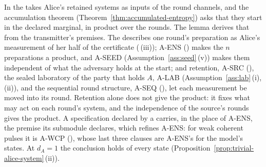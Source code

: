
In  the  takes Alice's retained
systems as inputs of the round channels, and the accumulation theorem
(Theorem~\ref{thm:accumulated-entropy}) asks that they start in the declared
marginal, in product over the rounds. The lemma derives that from the
transmitter's premises. The  describes
one round's preparation as Alice's measurement of her half of the certificate
(\,(iii)); A-ENS
() makes the $n$ preparations a product, and
A-SEED (Assumption~\ref{ass:seed}\,(v)) makes them independent of what the
adversary holds at the start; and retention, A-SRC
(), the sealed laboratory of the party that holds
$A$, A-LAB (Assumption~\ref{ass:lab}\,(i), (ii)), and the sequential round structure,
A-SEQ (), let each measurement be moved into its
round. Retention alone does not give the product: it fixes what may
act on each round's system, and the independence of the source's rounds gives
the product. A specification declared by a  carries, in
the place of A-ENS, the premise its submodule declares, which refines A-ENS:
for weak coherent pulses it is A-WCP (), whose
last three clauses are A-ENS's for the model's states. At $d_A=1$ the conclusion holds of every state
(Proposition~\ref{prop:trivial-alice-system}\,(ii)).

